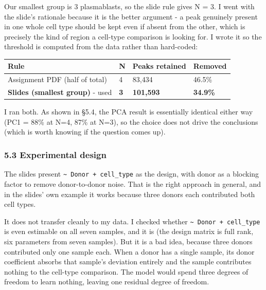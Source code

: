 \documentclass[
  11pt,
  a4paper,
]{article}
\newenvironment{Shaded}{}{}
\newcommand{\DecValTok}[1]{\textcolor[rgb]{0.25,0.63,0.44}{#1}}
\newcommand{\FunctionTok}[1]{\textcolor[rgb]{0.02,0.16,0.49}{#1}}
\newcommand{\NormalTok}[1]{#1}
\newcommand{\OtherTok}[1]{\textcolor[rgb]{0.00,0.44,0.13}{#1}}
\newcommand{\SpecialCharTok}[1]{\textcolor[rgb]{0.25,0.44,0.63}{#1}}
\newcommand{\StringTok}[1]{\textcolor[rgb]{0.25,0.44,0.63}{#1}}
\begin{document}
Our smallest group is 3 plasmablasts, so the slide rule gives N = 3. I
went with the slide's rationale because it is the better argument - a
peak genuinely present in one whole cell type should be kept even if
absent from the other, which is precisely the kind of region a cell-type
comparison is looking for. I wrote it so the threshold is computed from
the data rather than hard-coded:

\begin{Shaded}
\end{Shaded}

\begin{longtable}[]{@{}llll@{}}
\toprule\noalign{}
Rule & N & Peaks retained & Removed \\
\midrule\noalign{}
\endhead
\bottomrule\noalign{}
\endlastfoot
Assignment PDF (half of total) & 4 & 83,434 & 46.5\% \\
\textbf{Slides (smallest group)} - used & \textbf{3} & \textbf{101,593}
& \textbf{34.9\%} \\
\end{longtable}

I ran both. As shown in §5.4, the PCA result is essentially identical
either way (PC1 = 88\% at N=4, 87\% at N=3), so the choice does not
drive the conclusions (which is worth knowing if the question comes up).

\hypertarget{experimental-design}{%
\subsubsection{5.3 Experimental design}\label{experimental-design}}

The slides present \texttt{\textasciitilde{}\ Donor\ +\ cell\_type} as
the design, with donor as a blocking factor to remove donor-to-donor
noise. That is the right approach in general, and in the slides' own
example it works because three donors each contributed both cell types.

It does not transfer cleanly to my data. I checked whether
\texttt{\textasciitilde{}\ Donor\ +\ cell\_type} is even estimable on
all seven samples, and it is (the design matrix is full rank, six
parameters from seven samples). But it is a bad idea, because three
donors contributed only one sample each. When a donor has a single
sample, its donor coefficient absorbs that sample's deviation entirely
and the sample contributes nothing to the cell-type comparison. The
model would spend three degrees of freedom to learn nothing, leaving one
residual degree of freedom.
\end{document}
